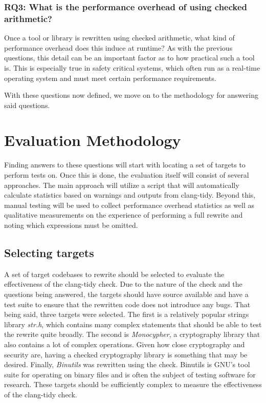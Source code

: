 \subsubsection{\textbf{RQ3: What is the performance overhead of using checked arithmetic?}}
Once a tool or library is rewritten using checked arithmetic, what kind of performance overhead does this induce at runtime? As with the previous questions, this detail can be an important factor as to how practical such a tool is. This is especially true in safety critical systems, which often run as a real-time operating system and must meet certain performance requirements.

With these questions now defined, we move on to the methodology for answering said questions.

\section{Evaluation Methodology}

Finding answers to these questions will start with locating a set of targets to perform tests on. Once this is done, the evaluation itself will consist of several approaches. The main approach will utilize a script that will automatically calculate statistics based on warnings and outputs from clang-tidy. Beyond this, manual testing will be used to collect performance overhead statistics as well as qualitative measurements on the experience of performing a full rewrite and noting which expressions must be omitted.

\subsection{Selecting targets}

A set of target codebases to rewrite should be selected to evaluate the effectiveness of the clang-tidy check. Due to the nature of the check and the questions being answered, the targets should have source available and have a test suite to ensure that the rewritten code does not introduce any bugs. That being said, three targets were selected. The first is a relatively popular strings library \textit{str.h}, which contains many complex statements that should be able to test the rewrite quite broadly. The second is \textit{Monocypher}, a cryptography library that also contains a lot of complex operations. Given how close cryptography and security are, having a checked cryptography library is something that may be desired. Finally, \textit{Binutils} was rewritten using the check. Binutils is GNU's tool suite for operating on binary files and is often the subject of testing software for research. These targets should be sufficiently complex to measure the effectiveness of the clang-tidy check.

